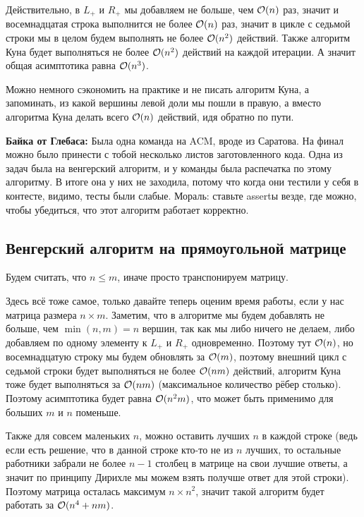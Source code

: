 Действительно, в $L_+$ и $R_+$ мы добавляем не больше, чем $\mathcal{O}(n)$ раз, значит
и восемнадцатая строка выполнится не более $\mathcal{O}(n)$ раз, значит в цикле с седьмой строки мы
в целом будем выполнять не более $\mathcal{O}(n^2)$ действий. Также
алгоритм Куна будет выполняться не более $\mathcal{O}(n^2)$ действий на каждой итерации.
А значит общая асимптотика равна $\mathcal{O}(n^3)$.

Можно немного сэкономить на практике
и не писать алгоритм Куна, а запоминать, из какой
вершины левой доли мы пошли в правую, а вместо алгоритма Куна делать всего
$\mathcal{O}(n)$ действий, идя обратно по пути.

{\bf Байка от Глебаса:} Была одна команда на ACM, вроде из Саратова. На финал
можно было принести с тобой несколько листов заготовленного кода.
Одна из задач была на венгерский алгоритм, и у команды была распечатка по этому алгоритму.
В итоге она у них не заходила, потому что когда они тестили у себя в контесте,
видимо, тесты были слабые. Мораль: ставьте assertы везде, где можно, чтобы
убедиться, что этот алгоритм работает корректно.

\subsection{Венгерский алгоритм на прямоугольной матрице}

Будем считать, что $n \leqslant m$, иначе просто транспонируем матрицу.

Здесь всё тоже самое, только давайте теперь оценим время работы, если у нас
матрица размера $n \times m$. Заметим, что в алгоритме мы будем добавлять не больше,
чем $\min(n, m) = n$ вершин, так как мы либо ничего не делаем, либо добавляем по
одному элементу к $L_+$ и $R_+$ одновременно. Поэтому тут $\mathcal{O}(n)$, но восемнадцатую строку
мы будем обновлять за $\mathcal{O}(m)$, поэтому внешний цикл с седьмой строки будет
выполняться не более $\mathcal{O}(nm)$ действий, алгоритм Куна тоже будет выполняться
за $\mathcal{O}(nm)$ (максимальное количество рёбер столько). Поэтому асимптотика будет
равна $\mathcal{O}(n^2m)$, что может быть применимо для больших $m$ и
$n$ поменьше.

Также для совсем маленьких $n$, можно оставить лучших $n$ в каждой строке (ведь
если есть решение, что в данной строке кто-то не из $n$ лучших, то остальные
работники забрали не более $n - 1$ столбец в матрице на свои лучшие ответы, а значит
по принципу Дирихле мы можем взять получше ответ для этой строки). Поэтому матрица
осталась максимум $n \times n^2$, значит такой алгоритм будет работать за $\mathcal{O}(n^4 + nm)$.


% 
